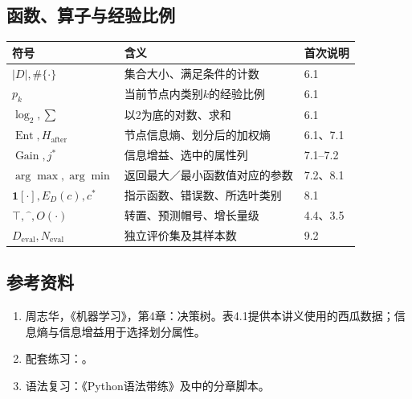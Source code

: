 \documentclass[UTF8,a4paper,11pt,fontset=fandol]{ctexart}
\numberwithin{equation}{subsection}
\begin{document}
\subsection{函数、算子与经验比例}
\par\noindent\begin{tabularx}{\textwidth}{L{3.2cm}Y L{2cm}}
\toprule
符号 & 含义 & 首次说明\\
\midrule
$|D|,\#\{\cdot\}$ & 集合大小、满足条件的计数 & 6.1\\
$p_k$ & 当前节点内类别$k$的经验比例 & 6.1\\
$\log_2,\sum$ & 以2为底的对数、求和 & 6.1\\
$\operatorname{Ent},H_{\mathrm{after}}$ & 节点信息熵、划分后的加权熵 & 6.1、7.1\\
$\operatorname{Gain},j^*$ & 信息增益、选中的属性列 & 7.1--7.2\\
$\arg\max,\arg\min$ & 返回最大／最小函数值对应的参数 & 7.2、8.1\\
$\mathbf1[\cdot],E_D(c),c^*$ & 指示函数、错误数、所选叶类别 & 8.1\\
$\top,\hat{\phantom{y}},O(\cdot)$ & 转置、预测帽号、增长量级 & 4.4、3.5\\
$D_{\mathrm{eval}},N_{\mathrm{eval}}$ & 独立评价集及其样本数 & 9.2\\
\bottomrule
\end{tabularx}\par
\subsection{参考资料}
\begin{enumerate}
\item 周志华，《机器学习》，第4章：决策树。表4.1提供本讲义使用的西瓜数据；信息熵与信息增益用于选择划分属性。
\item 配套练习：。
\item 语法复习：《Python语法带练》及中的分章脚本。
\end{enumerate}
\end{document}
